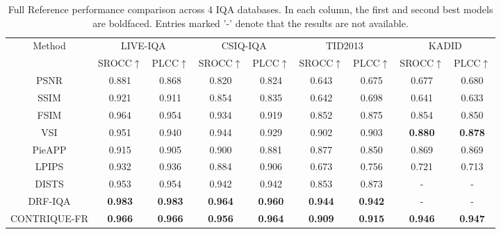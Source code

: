\documentclass[journal]{IEEEtran}
\begin{document}
\begin{table*}[t]
\centering
\caption{Full Reference performance comparison across 4 IQA databases. In each column, the first and second best models are boldfaced. Entries marked '-' denote that the results are not available.}
    \label{table:FR_methods_comparison}
    \begin{tabular}{|c||c|c|c|c|c|c|c|c|}
        \hline
        \multirow{2}{*}{Method}& \multicolumn{2}{|c|}{LIVE-IQA\cite{sheikh2006statistical}} & \multicolumn{2}{|c|}{CSIQ-IQA \cite{larson2010most}} & \multicolumn{2}{|c|}{TID2013 \cite{ponomarenko2015image}} & \multicolumn{2}{|c|}{KADID \cite{lin2019kadid}} \\
        \cline{2-9}
        ~ & SROCC$\uparrow$ & PLCC$\uparrow$ & SROCC$\uparrow$ & PLCC$\uparrow$ & SROCC$\uparrow$ & PLCC$\uparrow$ & SROCC$\uparrow$ & PLCC$\uparrow$ \\ \hline \hline
        PSNR & 0.881 & 0.868 & 0.820 & 0.824 & 0.643 & 0.675 & 0.677 & 0.680 \\ 
        SSIM \cite{wang2004image} & 0.921 & 0.911 & 0.854 & 0.835 & 0.642 & 0.698 & 0.641 & 0.633 \\  
        FSIM \cite{zhang2011fsim} & 0.964 & 0.954 & 0.934 & 0.919 & 0.852 & 0.875 & 0.854 & 0.850 \\
        VSI \cite{zhang2014vsi} & 0.951 & 0.940 & 0.944 & 0.929 & 0.902 & 0.903 & \textbf{0.880} & \textbf{0.878} \\ \hline
PieAPP \cite{prashnani2018pieapp} & 0.915 & 0.905 & 0.900 & 0.881 & 0.877 & 0.850 & 0.869 & 0.869 \\ 
        LPIPS \cite{zhang2018unreasonable} & 0.932 & 0.936 & 0.884 & 0.906 & 0.673 & 0.756 & 0.721 & 0.713 \\
        DISTS \cite{ding2020image} & 0.953 & 0.954 & 0.942 & 0.942 & 0.853 & 0.873 & - & - \\ 
        DRF-IQA \cite{kim2020dynamic} & \textbf{0.983} & \textbf{0.983} & \textbf{0.964} & \textbf{0.960} & \textbf{0.944} & \textbf{0.942} & - & - \\ \hline
        CONTRIQUE-FR & \textbf{0.966} & \textbf{0.966} & \textbf{0.956} & \textbf{0.964} & \textbf{0.909} & \textbf{0.915} & \textbf{0.946} & \textbf{0.947} \\  
        \hline
    \end{tabular}
\end{table*}
\end{document}
